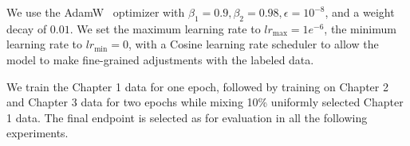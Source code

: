 We use the AdamW~\citep{loshchilov2017fixing} optimizer with $\beta_1 = 0.9, \beta_2 = 0.98, \epsilon = 10^{-8}$, and a weight decay of $0.01$. We set the maximum learning rate to $lr_{\text{max}} = 1e^{-6}$, the minimum learning rate to $lr_{\text{min}} = 0$, with a Cosine learning rate scheduler to allow the model to make fine-grained adjustments with the labeled data. 

 We train the Chapter 1 data for one epoch, followed by training on Chapter 2 and Chapter 3 data for two epochs while mixing 10\% uniformly selected Chapter 1 data. The final endpoint is selected as \modelname for evaluation in all the following experiments. 